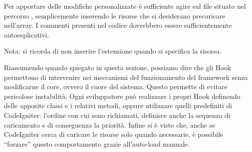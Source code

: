 Per apportare delle modifiche personalizzate è sufficiente agire sul file  situato nel percorso , semplicemente inserendo le risorse che si desiderano precaricare nell'array. I commenti presenti nel codice dovrebbero essere sufficientemente autoesplicativi.

Nota: si ricorda di non inserire l'estensione  quando si specifica la risorsa.

Riassumendo quando spiegato in questa sezione, possiamo dire che gli Hook permettono di intervenire nei meccanismi del funzionamento del framework senza modificarne il core, ovvero il cuore del sistema. Questo permette di evitare pericolose instabilità. Ogni sviluppatore può realizzare i propri Hook definendo delle apposite classi e i relativi metodi, oppure utilizzare quelli predefiniti di CodeIgniter: l'ordine con cui sono richiamati, definisce anche la sequenza di caricamento e di conseguenza la priorità. Infine si è visto che, anche se CodeIgniter cerca di caricare le risorse solo quando necessarie, è possibile ``forzare'' questo comportamento grazie all'auto-load manuale.